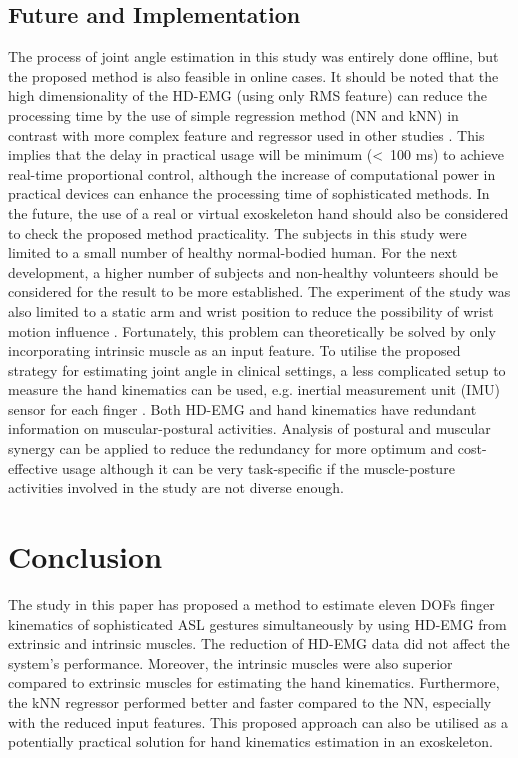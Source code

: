 \documentclass[conference]{IEEEtran}
\begin{document}
\subsection{Future and Implementation}
The process of joint angle estimation in this study was entirely done offline, but the proposed method 
is also feasible in online cases. It should be noted that the high dimensionality of the HD-EMG (using only 
RMS feature) can reduce the processing time by the use of simple regression method (NN and kNN) in 
contrast with more complex feature and regressor used in other studies \cite{b16}\cite{b19}. This implies that the delay 
in practical usage will be minimum (<~100 ms) to achieve real-time proportional control, although the 
increase of computational power in practical devices can enhance the processing time of sophisticated
methods. In the future, the use of a real or virtual exoskeleton hand should also be considered to check the 
proposed method practicality.
The subjects in this study were limited to a small number of healthy normal-bodied human. For the next 
development, a higher number of subjects and non-healthy volunteers should be considered for the result to 
be more established. The experiment of the study was also limited to a static arm and wrist position to reduce 
the possibility of wrist motion influence \cite{b39}. Fortunately, this problem can theoretically be solved by only 
incorporating intrinsic muscle as an input feature. To utilise the proposed strategy for estimating joint angle 
in clinical settings, a less complicated setup to measure the hand kinematics can be used, e.g. inertial 
measurement unit (IMU) sensor for each finger \cite{b40}.
Both HD-EMG and hand kinematics have redundant information on muscular-postural activities.
Analysis of postural and muscular synergy \cite{b36} can be applied to reduce the redundancy for more optimum 
and cost-effective usage although it can be very task-specific \cite{b41} if the muscle-posture activities involved 
in the study are not diverse enough.

\section{Conclusion}
The study in this paper has proposed a method to estimate eleven DOFs finger kinematics of 
sophisticated ASL gestures simultaneously by using HD-EMG from extrinsic and intrinsic muscles. The 
reduction of HD-EMG data did not affect the system's performance. Moreover, the intrinsic muscles were 
also superior compared to extrinsic muscles for estimating the hand kinematics. Furthermore, the kNN 
regressor performed better and faster compared to the NN, especially with the reduced input features. This 
proposed approach can also be utilised as a potentially practical solution for hand kinematics estimation in 
an exoskeleton.
\end{document}
